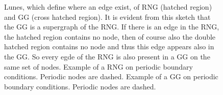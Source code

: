     \begin{figure}[htbp]
        \centering
        \caption[Gabriel - and Relative Neighborhood Graph]
        {
             Lunes, which define where an edge
                exist, of RNG (hatched region) and GG (cross hatched region).
                It is evident from this sketch that the GG is a supergraph
                of the RNG. If there is an edge in the RNG, the hatched
                region contains no node, then of course also the double
                hatched region contains no node and thus this edge appears
                also in the GG. So every egde of the RNG is also present
                in a GG on the same set of nodes.
             Example of a RNG on periodic
                boundary conditions. Periodic nodes are dashed.
             Example of a GG on
                periodic boundary conditions. Periodic nodes are dashed.
        }
        \label{fig:lunes}
    \end{figure}


